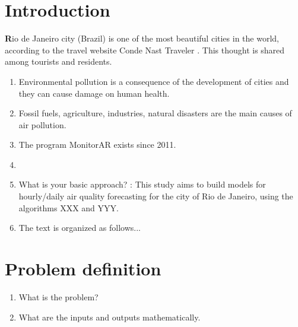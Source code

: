\section{Introduction}

\lettrine[findent=2pt]{\textbf{R}}{}io de Janeiro city (Brazil) is one of the
most beautiful cities in the world, according to the travel website Conde Nast
Traveler \cite{travelRio}. This thought is shared among tourists and
residents.

\begin{enumerate}
    \item Environmental pollution is a consequence of the development of
    cities and they can cause damage on human health. 
    \item Fossil fuels, agriculture, industries, natural disasters are the main
    causes of air pollution. 
    \item The program MonitorAR exists since 2011. 
    \item {}
    \item What is your basic approach? : This study aims to build models for hourly/daily air quality
    forecasting for the city of Rio de Janeiro, using the algorithms XXX and
    YYY.
    \item The text is organized as follows...
\end{enumerate}

\section{Problem definition}

\begin{enumerate}
    \item What is the problem?
    \item What are the inputs and outputs mathematically. 
\end{enumerate}